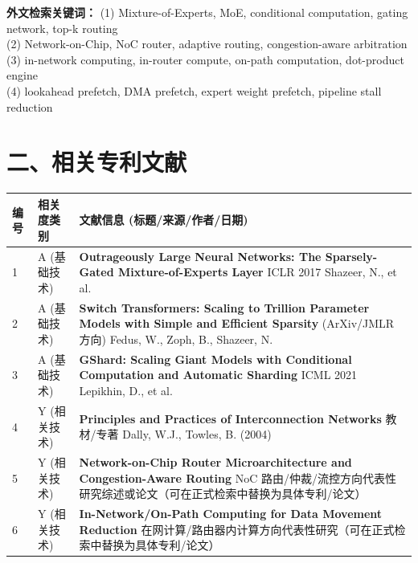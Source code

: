 \documentclass[12pt,a4paper]{article}
\begin{document}
\textbf{外文检索关键词：}
(1) Mixture-of-Experts, MoE, conditional computation, gating network, top-k routing \\
(2) Network-on-Chip, NoC router, adaptive routing, congestion-aware arbitration \\
(3) in-network computing, in-router compute, on-path computation, dot-product engine \\
(4) lookahead prefetch, DMA prefetch, expert weight prefetch, pipeline stall reduction

\section*{二、相关专利文献}

\renewcommand{\arraystretch}{1.5}
\begin{longtable}{|p{1.5cm}|p{6cm}|p{7.5cm}|}
\hline
\textbf{编号} & \textbf{相关度类别} & \textbf{文献信息 (标题/来源/作者/日期)} \\
\hline
1 & A (基础技术) & \textbf{Outrageously Large Neural Networks: The Sparsely-Gated Mixture-of-Experts Layer} \newline ICLR 2017 \newline Shazeer, N., et al. \\
\hline
2 & A (基础技术) & \textbf{Switch Transformers: Scaling to Trillion Parameter Models with Simple and Efficient Sparsity} \newline 2021 (ArXiv/JMLR 方向) \newline Fedus, W., Zoph, B., Shazeer, N. \\
\hline
3 & A (基础技术) & \textbf{GShard: Scaling Giant Models with Conditional Computation and Automatic Sharding} \newline ICML 2021 \newline Lepikhin, D., et al. \\
\hline
4 & Y (相关技术) & \textbf{Principles and Practices of Interconnection Networks} \newline 教材/专著 \newline Dally, W.J., Towles, B. (2004) \\
\hline
5 & Y (相关技术) & \textbf{Network-on-Chip Router Microarchitecture and Congestion-Aware Routing} \newline NoC 路由/仲裁/流控方向代表性研究综述或论文（可在正式检索中替换为具体专利/论文） \\
\hline
6 & Y (相关技术) & \textbf{In-Network/On-Path Computing for Data Movement Reduction} \newline 在网计算/路由器内计算方向代表性研究（可在正式检索中替换为具体专利/论文） \\
\hline
\end{longtable}
\end{document}
